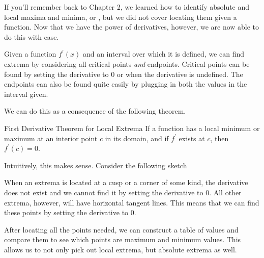 If you'll remember back to Chapter 2, we learned how to identify absolute and local maxima and minima, or , but we did not cover locating them given a function. Now that we have the power of derivatives, however, we are now able to do this with ease.

Given a function \( f^\prime \left( x \right) \) and an interval over which it is defined, we can find extrema by considering all critical points \textit{and} endpoints. Critical points can be found by setting the derivative to \( 0 \) or when the derivative is undefined. The endpoints can also be found quite easily by plugging in both the values in the interval given.

We can do this as a consequence of the following theorem.

\begin{theorem}{First Derivative Theorem for Local Extrema}
    If a function has a local minimum or maximum at an interior point \( c \) in its domain, and if \( f^\prime \) exists at \( c \), then \( f^\prime \left( c \right) = 0 \).
\end{theorem}

Intuitively, this makes sense. Consider the following sketch

\begin{figure}[H]
    \centering
    
\end{figure}

When an extrema is located at a cusp or a corner of some kind, the derivative does not exist and we cannot find it by setting the derivative to \( 0 \). All other extrema, however, will have horizontal tangent lines. This means that we can find these points by setting the derivative to \( 0 \).

\vspace{0.3cm}

After locating all the points needed, we can construct a table of values and compare them to see which points are maximum and minimum values. This allows us to not only pick out local extrema, but absolute extrema as well.

